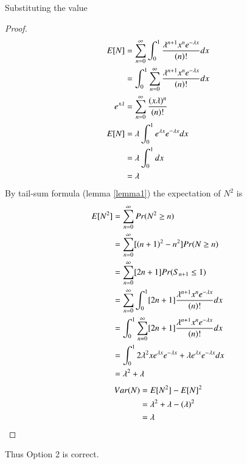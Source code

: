 \documentclass[journal,12pt,twocolumn]{IEEEtran}
\theoremstyle{definition}
\begin{document}
Substituting the value\\
\begin{proof}
\begin{align}
    E[ N ] &= \sum _{n = 0} ^\infty \int _0 ^1  \frac{\lambda^{n+1} x^{n}e^{-\lambda x}}{(n)!} dx\\
    &= \int _0 ^1 \sum _{n = 0} ^\infty \frac{\lambda^{n+1} x^{n}e^{-\lambda x}}{(n)!} dx\\
    e^{x\lambda} &= \sum _{n = 0} ^ \infty\frac{(x\lambda)^n}{(n)!}\\
    E[ N ] &=\lambda  \int _0 ^1 e^{\lambda x} e^{-\lambda x} dx\\
    &= \lambda \int _0 ^1 dx\\
    &= \lambda
\end{align}
By tail-sum formula (lemma \ref{lemma1}) the expectation of $N^2$ is\\
\begin{align}
    E[ N^2 ] &= \sum _{n = 0} ^\infty Pr(N^2 \geq n)\\
    &= \sum _{n = 0} ^\infty [(n+1)^2 - n^2] Pr(N \geq n)\\
    &= \sum _{n = 0} ^\infty [2n + 1] Pr(S_{n+1} \leq 1)\\
    &=  \sum _{n = 0} ^\infty \int _0 ^1 [2n+1] \frac{\lambda^{n+1} x^{n}e^{-\lambda x}}{(n)!} dx\\
    &= \int _0 ^1 \sum _{n = 0} ^\infty [2n+1]\frac{\lambda^{n+1} x^{n}e^{-\lambda x}}{(n)!} dx\\
    &= \int _0 ^1 2\lambda^2 x e^{\lambda x} e^{-\lambda x} + \lambda e^{\lambda x} e^{-\lambda x} dx\\
    &= \lambda ^2 + \lambda
\end{align}
\begin{align}
    Var(N) &= E[ N^2 ] - E[ N ]^2\\
    &= \lambda^2 + \lambda - (\lambda)^2\\
    &= \lambda
\end{align}
\end{proof}

Thus Option 2 is correct.
\end{document}

